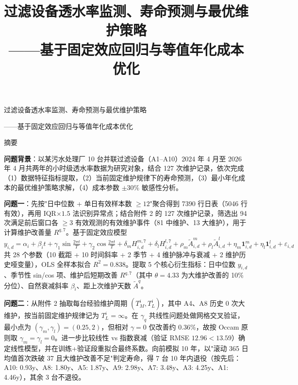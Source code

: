 \documentclass[12pt, a4paper, fontset=fandol]{ctexart}
\title{\bfseries 过滤设备透水率监测、寿命预测与最优维护策略\\
  \large——基于固定效应回归与等值年化成本优化}
\author{}
\date{}
\theoremstyle{definition}
\begin{document}
\thispagestyle{empty}
\begin{center}
{\heiti{} 过滤设备透水率监测、寿命预测与最优维护策略\par}
\vspace{0.25em}
{\heiti{} ——基于固定效应回归与等值年化成本优化\par}
\end{center}
\vspace{-0.6em}

\begin{center}
{\heiti{} 摘要}
\end{center}
\vspace{-0.9em}

\begingroup
\small
\linespread{1.0}\selectfont
\setlength{\parskip}{0.4em plus 0pt minus 0pt}
\setlength{\parindent}{0em}
\setlength{\abovedisplayskip}{2pt}
\setlength{\belowdisplayskip}{2pt}
\setlength{\lineskiplimit}{-3pt}
\setlength{\lineskip}{0pt}

\vspace{1.5em}
\textbf{问题背景}：以某污水处理厂 10 台并联过滤设备（A1--A10）2024 年 4 月至 2026 年 4 月共两年的小时级透水率数据为研究对象，结合 127 次维护记录，依次完成（1）数据特征指标提取，（2）当前固定维护规律下的寿命预测，（3）最小年化成本的最优维护策略求解，（4）成本参数 $\pm 30\%$ 敏感性分析。

\textbf{问题一}：先按"日中位数 + 单日有效样本数 $\ge 12$"聚合得到 7390 行日表（5046 行有效），再用 IQR$\times 1.5$ 法识别异常点；结合附件 2 的 127 次维护记录，筛选出 94 次满足前后窗口各 $\ge 3$ 有效观测的有效维护事件（81 中维护、13 大维护），用于计算维护改善量 $R^{q,7}$。基于固定效应模型
\[
y_{i,d} = \alpha_i + \beta_i t + \gamma_1 \sin\tfrac{2\pi t}{T} + \gamma_2 \cos\tfrac{2\pi t}{T} + \delta_m H^{m,7}_{i,d} + \delta_l H^{l,7}_{i,d} + \rho_m \tilde{A}^m_{i,d} + \rho_l \tilde{A}^l_{i,d} + \eta_m \mathbf{1}_{i,d}^m + \eta_l \mathbf{1}_{i,d}^l + \varepsilon_{i,d}
\]
共 28 个参数（10 截距 + 10 时间斜率 + 2 季节 + 4 维护脉冲与衰减 + 2 维护历史哑变量），OLS 全样本拟合 $R^2 = 0.838$。提取 5 个核心衍生指标：日中位数 $y_{i,d}$、季节性 sin/cos 项、维护后短期改善 $R^{q,7}$（其中 $\theta = 4.33$ 为大维护改善的 10\% 分位）、自然衰减斜率 $\beta_i$、距上次维护天数 $\tilde{A}^q$。

\textbf{问题二}：从附件 2 抽取每台经验维护周期 $(T_M^i, T_L^i)$，其中 A4、A8 历史 0 次大维护，按当前固定维护规律记为 $T_L^i=\infty$。在 $\gamma_q$ 共线性问题处做网格交叉验证，最小点为 $(\gamma_m,\gamma_l)=(0.25,2)$，但相对 $\gamma=0$ 仅改善约 0.36\%，故按 Occam 原则取 $\gamma_m=\gamma_l=0$。进一步比较线性 vs 指数衰减（验证 RMSE $12.96 < 13.59$）确定线性模型，并在训练+验证段重拟合最终系数。向前模拟 10 年，以"滚动 365 日均值首次跌破 37 且大维护改善不足"判定寿命，得 7 台 10 年内退役（按先后：A10: 0.93y、A8: 1.80y、A5: 1.87y、A9: 2.98y、A7: 3.48y、A3: 4.25y、A1: 4.46y），其余 3 台不退役。
\end{document}
